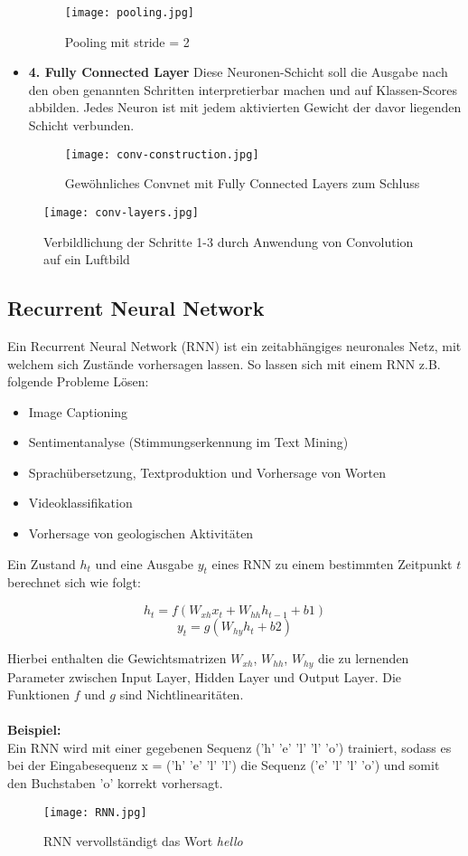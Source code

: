 \documentclass[11pt,ceqn]{book}
\begin{document}
\begin{itemize}
\begin{figure}[H]
\centering
\texttt{[image: pooling.jpg]}
\caption{Pooling mit stride = 2}
\end{figure}

\item \textbf{4. Fully Connected Layer} Diese Neuronen-Schicht soll die Ausgabe nach den oben genannten Schritten interpretierbar machen und auf Klassen-Scores abbilden. Jedes Neuron ist mit jedem aktivierten Gewicht der davor liegenden Schicht verbunden.
\begin{figure}[H]
\centering
\texttt{[image: conv-construction.jpg]}
\caption{Gewöhnliches Convnet mit Fully Connected Layers zum Schluss}
\end{figure}

\end{itemize}

\begin{figure}[H]
\centering
\texttt{[image: conv-layers.jpg]}
\caption{Verbildlichung der Schritte 1-3 durch Anwendung von Convolution auf ein Luftbild\protect\footnotemark}
\end{figure}


\subsection{Recurrent Neural Network}
Ein Recurrent Neural Network (RNN) ist ein zeitabhängiges neuronales Netz, mit welchem sich Zustände vorhersagen lassen. So lassen sich mit einem RNN z.B. folgende Probleme Lösen:

\begin{itemize}
\item Image Captioning
\item Sentimentanalyse (Stimmungserkennung im Text Mining)
\item Sprachübersetzung, Textproduktion und Vorhersage von Worten
\item Videoklassifikation
\item Vorhersage von geologischen Aktivitäten
\end{itemize}

Ein Zustand $h_t$ und eine Ausgabe $y_t$ eines RNN zu einem bestimmten Zeitpunkt $t$ berechnet sich wie folgt:

\[h_t = f(W_{xh} x_t + W_{hh} h_{t-1} + b1)\]
\[y_t = g(W_{hy} h_t + b2)\]

Hierbei enthalten die Gewichtsmatrizen $W_{xh}$, $W_{hh}$, $W_{hy}$ die zu lernenden Parameter zwischen Input Layer, Hidden Layer und Output Layer. Die Funktionen $f$ und $g$ sind Nichtlinearitäten.
\\~\\
\textbf{Beispiel:}\\
Ein RNN wird mit einer gegebenen Sequenz ('h' 'e' 'l' 'l' 'o') 
trainiert, sodass es bei der Eingabesequenz x = ('h' 'e' 'l' 'l') die Sequenz ('e' 'l' 'l' 'o') und somit den Buchstaben 'o' korrekt vorhersagt. 
\begin{figure}[H]
\centering
\texttt{[image: RNN.jpg]}
\caption{RNN vervollständigt das Wort \textit{hello}}
\end{figure}
\end{document}

